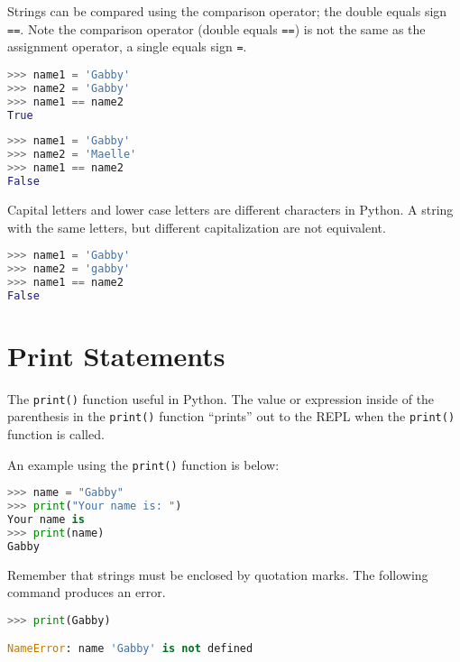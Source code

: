 \documentclass{book}
\newcommand{\passthrough}[1]{#1}
\begin{document}
    
        Strings can be compared using the comparison operator; the double equals
sign \passthrough{\lstinline!==!}. Note the comparison operator (double
equals \passthrough{\lstinline!==!}) is not the same as the assignment
operator, a single equals sign \passthrough{\lstinline!=!}.

\begin{lstlisting}[language=Python]
>>> name1 = 'Gabby'
>>> name2 = 'Gabby'
>>> name1 == name2
True
\end{lstlisting}

\begin{lstlisting}[language=Python]
>>> name1 = 'Gabby'
>>> name2 = 'Maelle'
>>> name1 == name2
False
\end{lstlisting}

Capital letters and lower case letters are different characters in
Python. A string with the same letters, but different capitalization are
not equivalent.

\begin{lstlisting}[language=Python]
>>> name1 = 'Gabby'
>>> name2 = 'gabby'
>>> name1 == name2
False
\end{lstlisting}
    




    
        \hypertarget{print-statements}{%
\section{Print Statements}\label{print-statements}}
    




    
        The \passthrough{\lstinline!print()!} function useful in Python. The
value or expression inside of the parenthesis in the
\passthrough{\lstinline!print()!} function ``prints'' out to the REPL
when the \passthrough{\lstinline!print()!} function is called.

An example using the \passthrough{\lstinline!print()!} function is
below:

\begin{lstlisting}[language=Python]
>>> name = "Gabby"
>>> print("Your name is: ")
Your name is
>>> print(name)
Gabby
\end{lstlisting}

Remember that strings must be enclosed by quotation marks. The following
command produces an error.

\begin{lstlisting}[language=Python]
>>> print(Gabby)

NameError: name 'Gabby' is not defined
\end{lstlisting}
\end{document}
